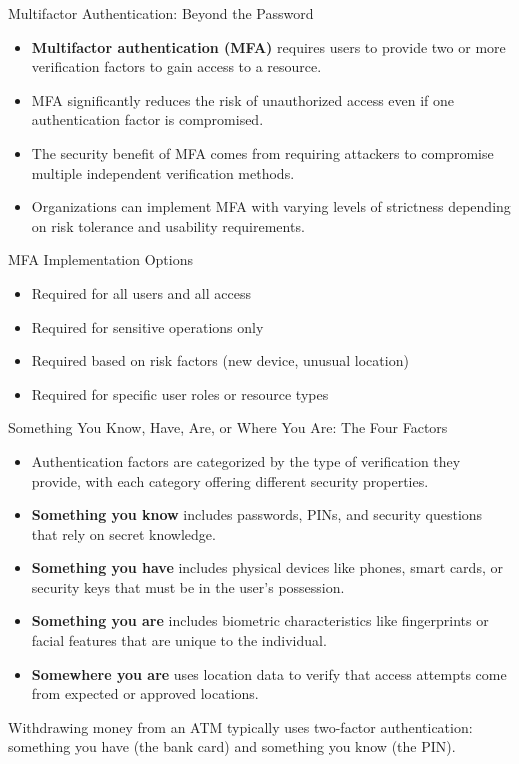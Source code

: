 \documentclass{beamer}
\begin{document}
\begin{frame}{Multifactor Authentication: Beyond the Password}
    \begin{itemize}
        \item \textbf{Multifactor authentication (MFA)} requires users to provide two or more verification factors to gain access to a resource.
        \item MFA significantly reduces the risk of unauthorized access even if one authentication factor is compromised.
        \item The security benefit of MFA comes from requiring attackers to compromise multiple independent verification methods.
        \item Organizations can implement MFA with varying levels of strictness depending on risk tolerance and usability requirements.
    \end{itemize}
    
    \begin{block}{MFA Implementation Options}
        \begin{itemize}
            \item Required for all users and all access
            \item Required for sensitive operations only
            \item Required based on risk factors (new device, unusual location)
            \item Required for specific user roles or resource types
        \end{itemize}
    \end{block}
\end{frame}

\begin{frame}{Something You Know, Have, Are, or Where You Are: The Four Factors}
    \begin{itemize}
        \item Authentication factors are categorized by the type of verification they provide, with each category offering different security properties.
        \item \textbf{Something you know} includes passwords, PINs, and security questions that rely on secret knowledge.
        \item \textbf{Something you have} includes physical devices like phones, smart cards, or security keys that must be in the user's possession.
        \item \textbf{Something you are} includes biometric characteristics like fingerprints or facial features that are unique to the individual.
        \item \textbf{Somewhere you are} uses location data to verify that access attempts come from expected or approved locations.
    \end{itemize}
    
    \begin{example}
        Withdrawing money from an ATM typically uses two-factor authentication: something you have (the bank card) and something you know (the PIN).
    \end{example}
\end{frame}
\end{document}
